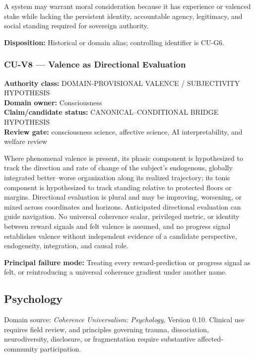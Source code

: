 \documentclass[
  11pt,
]{article}
\begin{document}
A system may warrant moral consideration because it has experience or
valenced stake while lacking the persistent identity, accountable
agency, legitimacy, and social standing required for sovereign
authority.

\textbf{Disposition:} Historical or domain alias; controlling identifier
is CU-G6.

\subsubsection{CU-V8 --- Valence as Directional
Evaluation}\label{cu-v8-valence-as-directional-evaluation}

\textbf{Authority class:} DOMAIN-PROVISIONAL VALENCE / SUBJECTIVITY
HYPOTHESIS\\
\textbf{Domain owner:} Consciousness\\
\textbf{Claim/candidate status:} CANONICAL--CONDITIONAL BRIDGE
HYPOTHESIS\\
\textbf{Review gate:} consciousness science, affective science, AI
interpretability, and welfare review

Where phenomenal valence is present, its phasic component is
hypothesized to track the direction and rate of change of the subject's
endogenous, globally integrated better--worse organization along its
realized trajectory; its tonic component is hypothesized to track
standing relative to protected floors or margins. Directional evaluation
is plural and may be improving, worsening, or mixed across coordinates
and horizons. Anticipated directional evaluation can guide navigation.
No universal coherence scalar, privileged metric, or identity between
reward signals and felt valence is assumed, and no progress signal
establishes valence without independent evidence of a candidate
perspective, endogeneity, integration, and causal role.

\textbf{Principal failure mode:} Treating every reward-prediction or
progress signal as felt, or reintroducing a universal coherence gradient
under another name.

\subsection{Psychology}\label{psychology}

Domain source: \emph{Coherence Universalism: Psychology}, Version 0.10.
Clinical use requires field review, and principles governing trauma,
dissociation, neurodiversity, disclosure, or fragmentation require
substantive affected-community participation.
\end{document}
